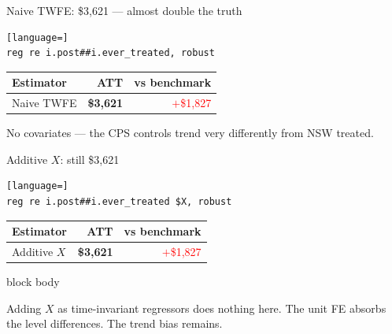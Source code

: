 \documentclass[aspectratio=169,11pt]{beamer}
\newcommand{\emphbox}[1]{%
  \begin{beamercolorbox}[rounded=true,sep=7pt,wd=\linewidth]{block body}%
    \small\color{slate}\raggedright #1%
  \end{beamercolorbox}}
\begin{document}
\begin{frame}[fragile]{Naive TWFE: \$3,621 --- almost double the truth}
\vspace{0.4em}
\begin{lstlisting}[language=]
reg re i.post##i.ever_treated, robust
\end{lstlisting}
\vspace{0.5em}
\begin{center}
\begin{tabular}{lrr}
\toprule
Estimator & ATT & vs benchmark \\
\midrule
Naive TWFE & \textbf{\$3,621} & \textcolor{red}{$+$\$1,827} \\
\bottomrule
\end{tabular}
\end{center}
\vspace{0.4em}
\begin{center}\color{warmgray}\small
No covariates --- the CPS controls trend very differently from NSW treated.
\end{center}
\end{frame}

\begin{frame}[fragile]{Additive $X$: still \$3,621}
\vspace{0.4em}
\begin{lstlisting}[language=]
reg re i.post##i.ever_treated $X, robust
\end{lstlisting}
\vspace{0.5em}
\begin{center}
\begin{tabular}{lrr}
\toprule
Estimator & ATT & vs benchmark \\
\midrule
Additive $X$ & \textbf{\$3,621} & \textcolor{red}{$+$\$1,827} \\
\bottomrule
\end{tabular}
\end{center}
\vspace{0.4em}
\emphbox{Adding $X$ as time-invariant regressors does nothing here. The unit FE absorbs the level differences. The trend bias remains.}
\end{frame}
\end{document}

